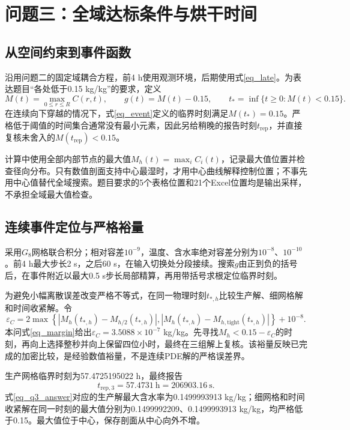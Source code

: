 \section{问题三：全域达标条件与烘干时间}
\subsection{从空间约束到事件函数}
沿用问题二的固定域耦合方程，前4 h使用观测环境，后期使用式\eqref{eq_late}。为表达题目“各处低于0.15 kg/kg”的要求，定义
\begin{equation}\label{eq_event}
M(t)=\max_{0\le r\le R}C(r,t),\qquad
g(t)=M(t)-0.15,\qquad
t_* =\inf\{t\ge0:M(t)<0.15\}.
\end{equation}
在连续向下穿越的情况下，式\eqref{eq_event}定义的临界时刻满足$M(t_*)=0.15$。严格低于阈值的时间集合通常没有最小元素，因此另给稍晚的报告时刻$t_{\mathrm{rep}}$，并直接复核未舍入的$M(t_{\mathrm{rep}})<0.15$。

计算中使用全部内部节点的最大值$M_h(t)=\max_iC_i(t)$，记录最大值位置并检查径向分布。只有数值剖面支持中心最湿时，才用中心曲线解释控制位置；不事先用中心值替代全域搜索。题目要求的5个表格位置和21个Excel位置均是输出采样，不承担全域最大值检查。

\subsection{连续事件定位与严格裕量}
采用$G_8$网格联合积分；相对容差$10^{-9}$，温度、含水率绝对容差分别为$10^{-8}$、$10^{-10}$。前4 h最大步长2 s，之后60 s，在输入切换处分段接续。搜索$g$由正到负的括号后，在事件附近以最大0.5 s步长局部精算，再用带括号求根定位临界时刻。

为避免小幅离散误差改变严格不等式，在同一物理时刻$t_{*,h}$比较生产解、细网格解和时间收紧解。令
\begin{equation}\label{eq_margin}
\varepsilon_C=2\max\left\{|M_h(t_{*,h})-M_{h/2}(t_{*,h})|,
|M_h(t_{*,h})-M_{h,\mathrm{tight}}(t_{*,h})|\right\}+10^{-8}.
\end{equation}
本问式\eqref{eq_margin}给出$\varepsilon_C=3.5088\times10^{-7}$ kg/kg。先寻找$M_h<0.15-\varepsilon_C$的时刻，再向上选择整秒并向上保留四位小时，最终在三组解上复核。该裕量反映已完成的加密比较，是经验数值裕量，不是连续PDE解的严格误差界。

生产网格临界时刻为57.4725195022 h，最终报告
\begin{equation}\label{eq_q3_answer}
\boxed{t_{\mathrm{rep},3}=57.4731\ \mathrm h=206903.16\ \mathrm s.}
\end{equation}
式\eqref{eq_q3_answer}对应的生产解最大含水率为0.1499993913 kg/kg；细网格和时间收紧解在同一时刻的最大值分别为0.1499992209、0.1499993913 kg/kg，均严格低于0.15。最大值位于中心，保存剖面从中心向外不增。

